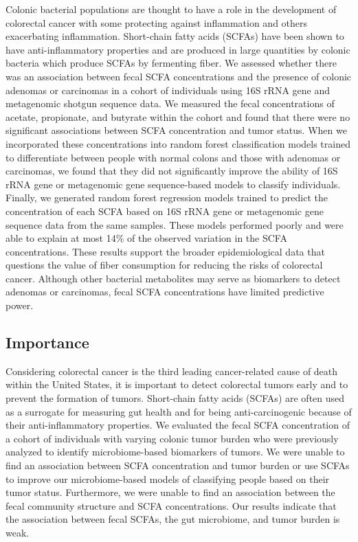 \documentclass[11pt,]{article}
\begin{document}
Colonic bacterial populations are thought to have a role in the
development of colorectal cancer with some protecting against
inflammation and others exacerbating inflammation. Short-chain fatty
acids (SCFAs) have been shown to have anti-inflammatory properties and
are produced in large quantities by colonic bacteria which produce SCFAs
by fermenting fiber. We assessed whether there was an association
between fecal SCFA concentrations and the presence of colonic adenomas
or carcinomas in a cohort of individuals using 16S rRNA gene and
metagenomic shotgun sequence data. We measured the fecal concentrations
of acetate, propionate, and butyrate within the cohort and found that
there were no significant associations between SCFA concentration and
tumor status. When we incorporated these concentrations into random
forest classification models trained to differentiate between people
with normal colons and those with adenomas or carcinomas, we found that
they did not significantly improve the ability of 16S rRNA gene or
metagenomic gene sequence-based models to classify individuals. Finally,
we generated random forest regression models trained to predict the
concentration of each SCFA based on 16S rRNA gene or metagenomic gene
sequence data from the same samples. These models performed poorly and
were able to explain at most 14\% of the observed variation in the SCFA
concentrations. These results support the broader epidemiological data
that questions the value of fiber consumption for reducing the risks of
colorectal cancer. Although other bacterial metabolites may serve as
biomarkers to detect adenomas or carcinomas, fecal SCFA concentrations
have limited predictive power.

\newpage

\hypertarget{importance}{%
\subsection{Importance}\label{importance}}

Considering colorectal cancer is the third leading cancer-related cause
of death within the United States, it is important to detect colorectal
tumors early and to prevent the formation of tumors. Short-chain fatty
acids (SCFAs) are often used as a surrogate for measuring gut health and
for being anti-carcinogenic because of their anti-inflammatory
properties. We evaluated the fecal SCFA concentration of a cohort of
individuals with varying colonic tumor burden who were previously
analyzed to identify microbiome-based biomarkers of tumors. We were
unable to find an association between SCFA concentration and tumor
burden or use SCFAs to improve our microbiome-based models of
classifying people based on their tumor status. Furthermore, we were
unable to find an association between the fecal community structure and
SCFA concentrations. Our results indicate that the association between
fecal SCFAs, the gut microbiome, and tumor burden is weak.
\end{document}
